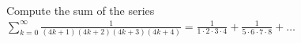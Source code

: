 Compute the sum of the series
\(\sum_{k=0}^{\infty} \frac{1}{(4k+1)(4k+2)(4k+3)(4k+4)} = \frac{1}{1\cdot2\cdot3\cdot4} + \frac{1}{5\cdot6\cdot7\cdot8} + \dots\)
